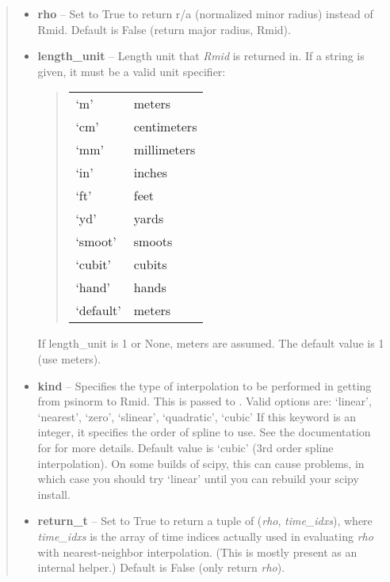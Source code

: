 \documentclass[letterpaper,10pt,english]{sphinxmanual}
\begin{document}
\begin{fulllineitems}
\begin{fulllineitems}
\begin{quote}
\begin{description}
\begin{itemize}
\item {} 
\textbf{rho} -- Set to True to return r/a (normalized minor radius)
instead of Rmid. Default is False (return major radius, Rmid).

\item {} 
\textbf{length\_unit} -- 
Length unit that \emph{Rmid} is returned in.
If a string is given, it must be a valid unit specifier:
\begin{quote}

\begin{tabulary}{\linewidth}{|L|L|}
\hline

`m'
 & 
meters
\\

`cm'
 & 
centimeters
\\

`mm'
 & 
millimeters
\\

`in'
 & 
inches
\\

`ft'
 & 
feet
\\

`yd'
 & 
yards
\\

`smoot'
 & 
smoots
\\

`cubit'
 & 
cubits
\\

`hand'
 & 
hands
\\

`default'
 & 
meters
\\
\hline\end{tabulary}

\end{quote}

If length\_unit is 1 or None, meters are assumed. The default
value is 1 (use meters).


\item {} 
\textbf{kind} -- Specifies the type of
interpolation to be performed in getting from psinorm to
Rmid. This is passed to
. Valid options are:
`linear', `nearest', `zero', `slinear', `quadratic', `cubic'
If this keyword is an integer, it specifies the order of spline
to use. See the documentation for  for more
details. Default value is `cubic' (3rd order spline
interpolation). On some builds of scipy, this can cause problems,
in which case you should try `linear' until you can rebuild your
scipy install.

\item {} 
\textbf{return\_t} -- Set to True to return a tuple of (\emph{rho},
\emph{time\_idxs}), where \emph{time\_idxs} is the array of time indices
actually used in evaluating \emph{rho} with nearest-neighbor
interpolation. (This is mostly present as an internal helper.)
Default is False (only return \emph{rho}).


\end{itemize}
\end{description}
\end{quote}
\end{fulllineitems}
\end{fulllineitems}
\end{document}
